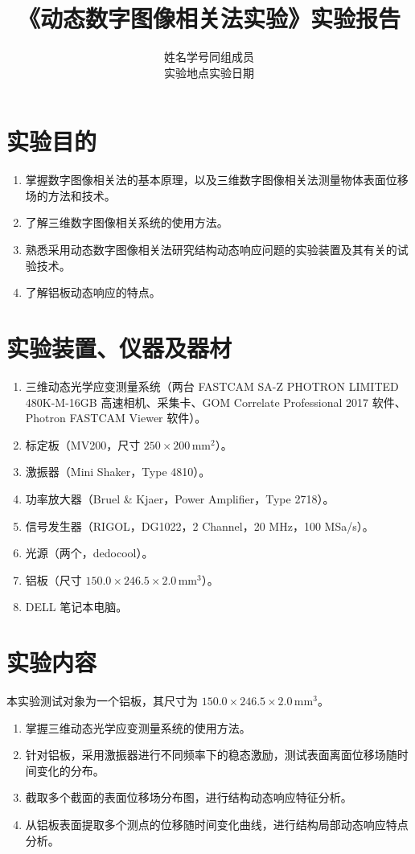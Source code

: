 \documentclass[UTF8,a4paper,12pt]{ctexart}
\title{《动态数字图像相关法实验》实验报告}
\author{姓名\blank[2.5cm] \quad 学号\blank[3cm] \quad 同组成员\blank[4cm]\\[1em]
实验地点\blank[3cm] \quad 实验日期\blank[4cm]}
\date{}
\numberwithin{equation}{section}
\begin{document}
\maketitle
\tableofcontents
\clearpage

\section{实验目的}
\begin{enumerate}
  \item 掌握数字图像相关法的基本原理，以及三维数字图像相关法测量物体表面位移场的方法和技术。
  \item 了解三维数字图像相关系统的使用方法。
  \item 熟悉采用动态数字图像相关法研究结构动态响应问题的实验装置及其有关的试验技术。
  \item 了解铝板动态响应的特点。
\end{enumerate}

\section{实验装置、仪器及器材}
\begin{enumerate}
  \item 三维动态光学应变测量系统（两台 FASTCAM SA-Z PHOTRON LIMITED 480K-M-16GB 高速相机、采集卡、GOM Correlate Professional 2017 软件、Photron FASTCAM Viewer 软件）。
  \item 标定板（MV200，尺寸 $250\times200\,\mathrm{mm}^2$）。
  \item 激振器（Mini Shaker，Type 4810）。
  \item 功率放大器（Bruel \& Kjaer，Power Amplifier，Type 2718）。
  \item 信号发生器（RIGOL，DG1022，2 Channel，20 MHz，100 MSa/s）。
  \item 光源（两个，dedocool）。
  \item 铝板（尺寸 $150.0\times246.5\times2.0\,\mathrm{mm}^3$）。
  \item DELL 笔记本电脑。
\end{enumerate}

\section{实验内容}
本实验测试对象为一个铝板，其尺寸为 $150.0\times246.5\times2.0\,\mathrm{mm}^3$。
\begin{enumerate}
  \item 掌握三维动态光学应变测量系统的使用方法。
  \item 针对铝板，采用激振器进行不同频率下的稳态激励，测试表面离面位移场随时间变化的分布。
  \item 截取多个截面的表面位移场分布图，进行结构动态响应特征分析。
  \item 从铝板表面提取多个测点的位移随时间变化曲线，进行结构局部动态响应特点分析。
\end{enumerate}
\end{document}
